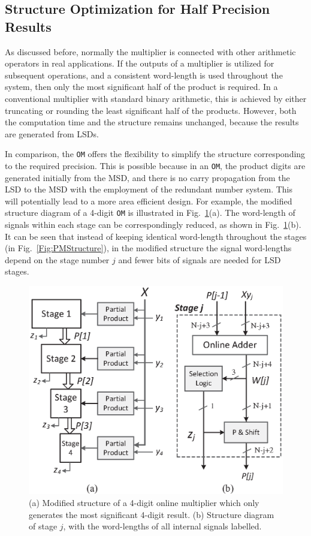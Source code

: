 \documentclass[conference]{IEEEtran}
\begin{document}
\subsection{Structure Optimization for Half Precision Results}\vspace{-0.5ex}
As discussed before, normally the multiplier is connected with other arithmetic operators in real applications. If the outputs of a multiplier is utilized for subsequent operations, and a consistent word-length is used throughout the system, then only the most significant half of the product is required. In a conventional multiplier with standard binary arithmetic, this is achieved by either truncating or rounding the least significant half of the products. However, both the computation time and the structure remains unchanged, because the results are generated from LSDs.\vspace{-0.5ex}

In comparison, the \texttt{OM} offers the flexibility to simplify the structure corresponding to the required precision. This is possible because in an \texttt{OM}, the product digits are generated initially from the MSD, and there is no carry propagation from the LSD to the MSD with the employment of the redundant number system. This will potentially lead to a more area efficient design. For example, the modified structure diagram of a 4-digit \texttt{OM} is illustrated in Fig.~\ref{Fig:PMStructure_MSDhalf}(a). The word-length of signals within each stage can be correspondingly reduced, as shown in Fig.~\ref{Fig:PMStructure_MSDhalf}(b). It can be seen that instead of keeping identical word-length throughout the stages (in Fig.~\ref{Fig:PMStructure}), in the modified structure the signal word-lengths depend on the stage number $j$ and fewer bits of signals are needed for LSD stages.\vspace{-3ex}
%
\begin{figure}[tbp]
	\centering
	\includegraphics[width=.5\textwidth]{./Figures/ParallelMult_MSDhalf.eps}
  \vspace{-2ex}
	\caption{(a) Modified structure of a 4-digit online multiplier which only generates the most significant 4-digit result. (b) Structure diagram of stage $j$, with the word-lengths of all internal signals labelled.}
	\label{Fig:PMStructure_MSDhalf}
	\vspace{-2ex}
\end{figure}
\end{document}
